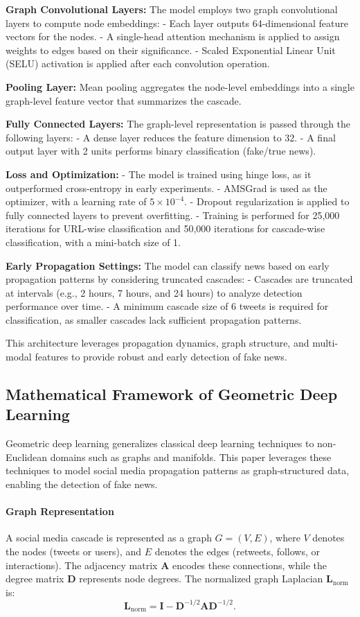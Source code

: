\documentclass[sigconf,nonacm]{acmart}
\begin{document}
\textbf{Graph Convolutional Layers:}  
The model employs two graph convolutional layers to compute node embeddings:
- Each layer outputs 64-dimensional feature vectors for the nodes.
- A single-head attention mechanism is applied to assign weights to edges based on their significance.
- Scaled Exponential Linear Unit (SELU) activation is applied after each convolution operation.

\textbf{Pooling Layer:}  
Mean pooling aggregates the node-level embeddings into a single graph-level feature vector that summarizes the cascade.

\textbf{Fully Connected Layers:}  
The graph-level representation is passed through the following layers:
- A dense layer reduces the feature dimension to 32.
- A final output layer with 2 units performs binary classification (fake/true news).

\textbf{Loss and Optimization:}  
- The model is trained using hinge loss, as it outperformed cross-entropy in early experiments.
- AMSGrad is used as the optimizer, with a learning rate of \( 5 \times 10^{-4} \).
- Dropout regularization is applied to fully connected layers to prevent overfitting.
- Training is performed for 25,000 iterations for URL-wise classification and 50,000 iterations for cascade-wise classification, with a mini-batch size of 1.

\textbf{Early Propagation Settings:}  
The model can classify news based on early propagation patterns by considering truncated cascades:
- Cascades are truncated at intervals (e.g., 2 hours, 7 hours, and 24 hours) to analyze detection performance over time.
- A minimum cascade size of 6 tweets is required for classification, as smaller cascades lack sufficient propagation patterns.

This architecture leverages propagation dynamics, graph structure, and multi-modal features to provide robust and early detection of fake news.




\subsection{Mathematical Framework of Geometric Deep Learning}
Geometric deep learning generalizes classical deep learning techniques to non-Euclidean domains such as graphs and manifolds. This paper leverages these techniques to model social media propagation patterns as graph-structured data, enabling the detection of fake news.

\paragraph{Graph Representation}
A social media cascade is represented as a graph \( G = (V, E) \), where \( V \) denotes the nodes (tweets or users), and \( E \) denotes the edges (retweets, follows, or interactions). The adjacency matrix \( \bm{A} \) encodes these connections, while the degree matrix \( \bm{D} \) represents node degrees. The normalized graph Laplacian \( \bm{L}_{\text{norm}} \) is:
\[
\bm{L}_{\text{norm}} = \bm{I} - \bm{D}^{-1/2} \bm{A} \bm{D}^{-1/2}.
\]
\end{document}
